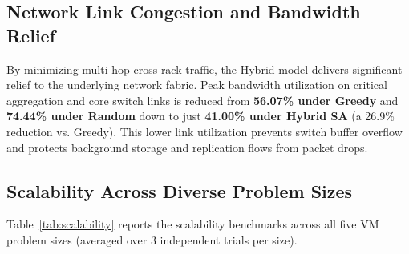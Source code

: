 \documentclass[conference]{IEEEtran}
\begin{document}
\subsection{Network Link Congestion and Bandwidth Relief}
By minimizing multi-hop cross-rack traffic, the Hybrid model delivers significant relief to the underlying network fabric. Peak bandwidth utilization on critical aggregation and core switch links is reduced from \textbf{56.07\% under Greedy} and \textbf{74.44\% under Random} down to just \textbf{41.00\% under Hybrid SA} (a 26.9\% reduction vs. Greedy). This lower link utilization prevents switch buffer overflow and protects background storage and replication flows from packet drops.

\subsection{Scalability Across Diverse Problem Sizes}
Table~\ref{tab:scalability} reports the scalability benchmarks across all five VM problem sizes (averaged over 3 independent trials per size).
\end{document}
